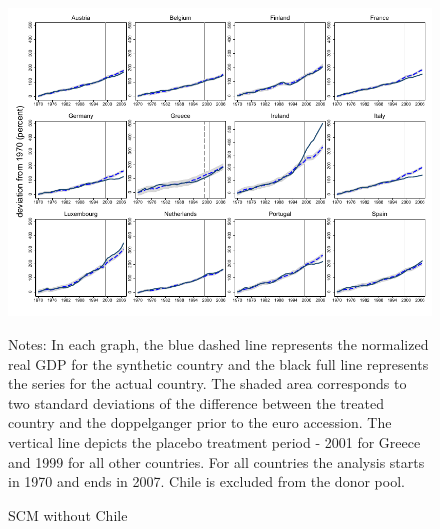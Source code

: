 \documentclass[12pt]{article}
\newcommand{\annote}[1]{\parbox{\textwidth}{\renewcommand{\baselinestretch}{1.0}\vspace{12pt} \small Notes: #1}}
\begin{document}
\begin{appendices}
\begin{figure}[h!]
    \centering
    \label{F_CHL}
    \caption{SCM without Chile}
    \includegraphics[scale=0.7]{Output/Figures/SCM_gdp_Rob_1999_Annual_CHL.pdf}
     \annote{In each graph, the blue dashed line represents the normalized real GDP for the synthetic country and the black full line represents the series for the actual country. The shaded area corresponds to two standard deviations of the difference between the treated country and the doppelganger prior to the euro accession. The vertical line depicts the placebo treatment period - 2001 for Greece and 1999 for all other countries. For all countries the analysis starts in 1970 and ends in 2007. Chile is excluded from the donor pool. }
\end{figure}


\end{appendices}
\end{document}

